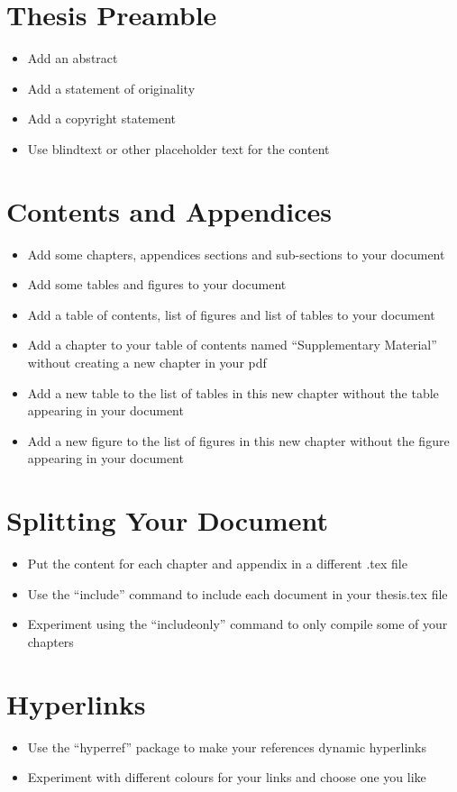 \documentclass[11pt,a4paper]{article}
\begin{document}
\section{Thesis Preamble}
\begin{itemize}
\item Add an abstract
\item Add a statement of originality
\item Add a copyright statement
\item Use blindtext or other placeholder text for the content
\end{itemize}

\section{Contents and Appendices}
\begin{itemize}
\item Add some chapters, appendices sections and sub-sections to your document
\item Add some tables and figures to your document
\item Add a table of contents, list of figures and list of tables to your document
\item Add a chapter to your table of contents named ``Supplementary Material'' without creating a new chapter in your pdf
\item Add a new table to the list of tables in this new chapter without the table appearing in your document
\item Add a new figure to the list of figures in this new chapter without the figure appearing in your document
\end{itemize}

\section{Splitting Your Document}
\begin{itemize}
\item Put the content for each chapter and appendix in a different .tex file
\item Use the ``include'' command to include each document in your thesis.tex file
\item Experiment using the ``includeonly'' command to only compile some of your chapters
\end{itemize}

\section{Hyperlinks}
\begin{itemize}
\item Use the ``hyperref'' package to make your references dynamic hyperlinks
\item Experiment with different colours for your links and choose one you like
\end{itemize}
\end{document}
